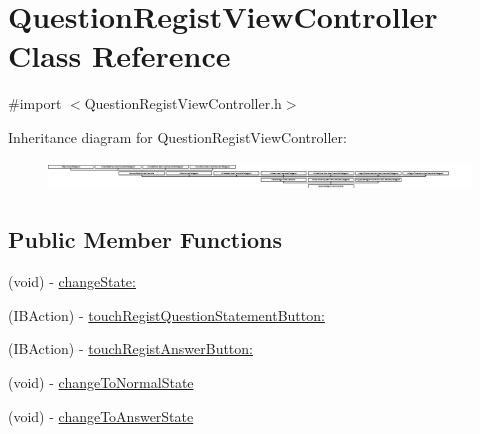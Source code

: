 \hypertarget{interface_question_regist_view_controller}{
\section{QuestionRegistViewController Class Reference}
\label{interface_question_regist_view_controller}
}


{\ttfamily \#import $<$QuestionRegistViewController.h$>$}

Inheritance diagram for QuestionRegistViewController:\begin{figure}[H]
\begin{center}
\leavevmode
\includegraphics[height=0.790123cm]{interface_question_regist_view_controller}
\end{center}
\end{figure}
\subsection*{Public Member Functions}
\begin{DoxyCompactItemize}
\item 
(void) -\/ \hyperlink{interface_question_regist_view_controller_a00a004ba559a1f74f35b39c7f9235e2a}{changeState:}
\item 
(IBAction) -\/ \hyperlink{interface_question_regist_view_controller_a3e148ea6d1a9c5e5415d5413d82e59fa}{touchRegistQuestionStatementButton:}
\item 
(IBAction) -\/ \hyperlink{interface_question_regist_view_controller_a236261e70ca21480e12774649f236fb8}{touchRegistAnswerButton:}
\item 
(void) -\/ \hyperlink{interface_question_regist_view_controller_a46cd4724677ae7a6751551b24b6390a9}{changeToNormalState}
\item 
(void) -\/ \hyperlink{interface_question_regist_view_controller_a5711291ba785d799fa2c2ef5345b88d5}{changeToAnswerState}
\end{DoxyCompactItemize}
